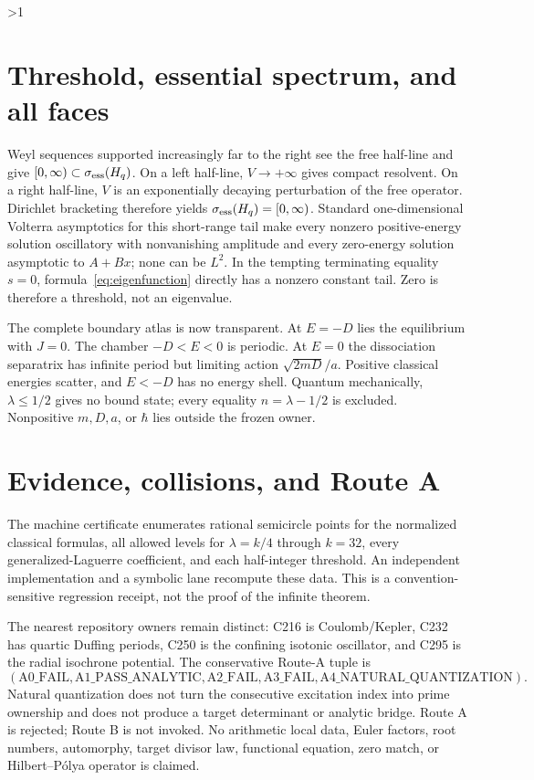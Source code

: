 \documentclass[10pt]{article}
\providecommand{\CRevisionRound}{2}
\begin{document}
\ifnum\CRevisionRound>1
\section{Threshold, essential spectrum, and all faces}
Weyl sequences supported increasingly far to the right see the free
half-line and give $[0,\infty)\subset\sigma_{\rm ess}(H_q)$.  On a left
half-line, $V\to+\infty$ gives compact resolvent.  On a right half-line,
$V$ is an exponentially decaying perturbation of the free operator.
Dirichlet bracketing therefore yields
$\sigma_{\rm ess}(H_q)=[0,\infty)$.  Standard one-dimensional Volterra
asymptotics for this short-range tail make every nonzero positive-energy
solution oscillatory with nonvanishing amplitude and every zero-energy
solution asymptotic to $A+Bx$; none can be $L^2$.  In the tempting
terminating equality $s=0$, formula~\eqref{eq:eigenfunction} directly has
a nonzero constant tail.  Zero is therefore a threshold, not an eigenvalue.

The complete boundary atlas is now transparent.  At $E=-D$ lies the
equilibrium with $J=0$.  The chamber $-D<E<0$ is periodic.  At $E=0$ the
dissociation separatrix has infinite period but limiting action
$\sqrt{2mD}/a$.  Positive classical energies scatter, and $E<-D$ has no
energy shell.  Quantum mechanically, $\lambda\leq1/2$ gives no bound state;
every equality $n=\lambda-1/2$ is excluded.  Nonpositive $m,D,a$, or
$\hbar$ lies outside the frozen owner.

\section{Evidence, collisions, and Route A}
The machine certificate enumerates rational semicircle points for the
normalized classical formulas, all allowed levels for
$\lambda=k/4$ through $k=32$, every generalized-Laguerre coefficient, and
each half-integer threshold.  An independent implementation and a symbolic
lane recompute these data.  This is a convention-sensitive regression
receipt, not the proof of the infinite theorem.

The nearest repository owners remain distinct: C216 is Coulomb/Kepler,
C232 has quartic Duffing periods, C250 is the confining isotonic oscillator,
and C295 is the radial isochrone potential.  The conservative Route-A tuple
is
\[
 (\mathrm{A0\_FAIL},\mathrm{A1\_PASS\_ANALYTIC},\mathrm{A2\_FAIL},
  \mathrm{A3\_FAIL},\mathrm{A4\_NATURAL\_QUANTIZATION}).
\]
Natural quantization does not turn the consecutive excitation index into
prime ownership and does not produce a target determinant or analytic
bridge.  Route A is rejected; Route B is not invoked.  No arithmetic local
data, Euler factors, root numbers, automorphy, target divisor law,
functional equation, zero match, or Hilbert--P\'olya operator is claimed.
\fi
\end{document}
